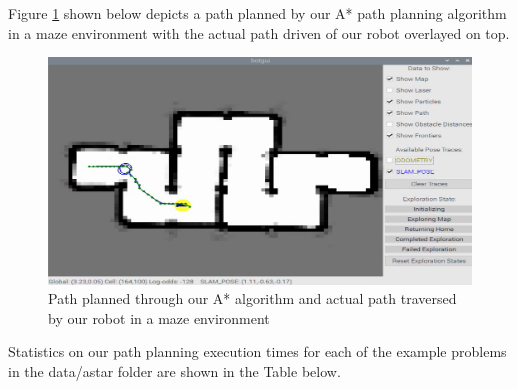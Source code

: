 \documentclass[journal]{IEEEtran}
\begin{document}
Figure \ref{figure_3_2} shown below depicts a path planned by our A* path planning algorithm in a maze environment with the actual path driven of our robot overlayed on top.

\begin{figure}[h]
\begin{center}
\includegraphics[width=1\linewidth]{image_3/figure_3_2.jpg}
\end{center}
   \caption{Path planned through our A* algorithm and actual path traversed by our robot in a maze environment}
   \label{figure_3_2}
\end{figure}

Statistics on our path planning execution times for each of the example problems in the data/astar folder are shown in the Table below.

\begin{center}
\end{center} 

\begin{center}
\end{center} 
\end{document}
